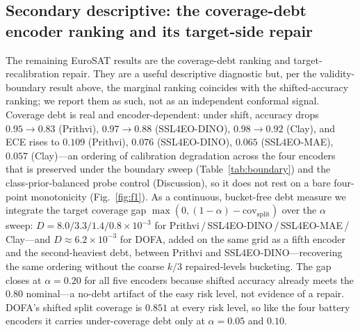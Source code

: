 \documentclass[journal]{IEEEtran}
\renewcommand{\_}{\textunderscore\allowbreak}
\begin{document}
\subsection{Secondary descriptive: the coverage-debt encoder ranking and its target-side repair}
The remaining EuroSAT results are the coverage-debt ranking and target-recalibration repair. They are a
useful descriptive diagnostic but, per the validity-boundary result above, the marginal ranking coincides
with the shifted-accuracy ranking; we report them as such, not as an independent conformal signal.
Coverage debt is real and encoder-dependent: under shift, accuracy drops $0.95\to0.83$ (Prithvi),
$0.97\to0.88$ (SSL4EO-DINO), $0.98\to0.92$ (Clay), and ECE rises to $0.109$ (Prithvi),
$0.076$ (SSL4EO-DINO), $0.065$ (SSL4EO-MAE), $0.057$ (Clay)---an ordering of calibration degradation across
the four encoders that is preserved under the boundary sweep (Table~\ref{tab:boundary}) and the
class-prior-balanced probe control (Discussion), so it does not rest on a bare four-point monotonicity
(Fig.~\ref{fig:f1}). As a continuous, bucket-free debt measure we integrate the target coverage gap
$\max(0,(1-\alpha)-\mathrm{cov}_{\mathrm{split}})$ over the $\alpha$ sweep:
$D = 8.0 / 3.3 / 1.4 / 0.8 \times 10^{-3}$ for Prithvi\,/\,SSL4EO-DINO\,/\,SSL4EO-MAE\,/\,Clay---and $D\approx6.2\times10^{-3}$ for DOFA, added on the same grid as a fifth encoder and the second-heaviest debt, between Prithvi and SSL4EO-DINO---recovering the
same ordering without the coarse $k/3$ repaired-levels bucketing. The gap closes at $\alpha=0.20$ for all
five encoders because shifted accuracy already meets the $0.80$ nominal---a no-debt artifact of the
easy risk level, not evidence of a repair. DOFA's shifted split coverage is $0.851$ at every risk level, so
like the four battery encoders it carries under-coverage debt only at $\alpha=0.05$ and $0.10$.
\end{document}
